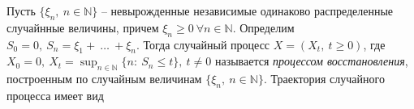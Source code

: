 \begin{example}
Пусть $\displaystyle \{\xi _{n} ,\ n\in \mathbb{N}\}$ -- невырожденные независимые одинаково распределенные случайнные величины, причем $\displaystyle \xi _{n} \geqslant 0\ \forall n\in \mathbb{N}$. Определим $\displaystyle S_{0} =0,\ S_{n} =\xi _{1} +\ \dotsc \ +\xi _{n}$. Тогда случайный процесс $\displaystyle X=( X_{t} ,\ t\geqslant 0)$, где $\displaystyle X_{0} =0,\ X_{t} =\sup _{n\in \mathbb{N}}\{n:\ S_{n} \leqslant t\} ,\ t\neq 0$ называется \textit{процессом восстановления}, построенным по случайным величинам $\displaystyle \{\xi _{n} ,\ n\in \mathbb{N}\}$. Траектория случайного процесса имеет вид





\begin{tikzpicture}[x=0.75pt,y=0.75pt,yscale=-1,xscale=1]


\end{tikzpicture}
\end{example}
